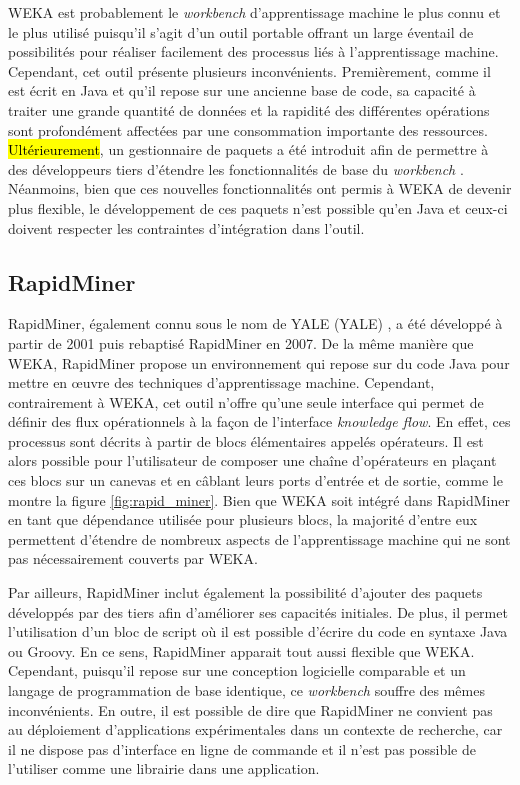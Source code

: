 \acs{WEKA} est probablement le \textit{workbench} d'apprentissage machine le plus connu et le plus utilisé puisqu'il s'agit d'un outil portable \citep{Bouckaert2010} offrant un large éventail de possibilités pour réaliser facilement des processus liés à l'apprentissage machine. Cependant, cet outil présente plusieurs inconvénients. Premièrement, comme il est écrit en Java et qu'il repose sur une ancienne base de code, sa capacité à traiter une grande quantité de données et la rapidité des différentes opérations sont profondément affectées par une consommation importante des ressources. \hl{Ultérieurement}, un gestionnaire de paquets a été introduit afin de permettre à des développeurs tiers d'étendre les fonctionnalités de base du \textit{workbench} \citep{Hall2009}. Néanmoins, bien que ces nouvelles fonctionnalités ont permis à \acs{WEKA} de devenir plus flexible, le développement de ces paquets n'est possible qu'en Java et ceux-ci doivent respecter les contraintes d'intégration dans l'outil.

\subsection{RapidMiner}

RapidMiner, également connu sous le nom de \acs{YALE} (\acl{YALE}) \citep{Ritthoo2003,Hofmann2014}, a été développé à partir de 2001 puis rebaptisé RapidMiner en 2007. De la même manière que \acs{WEKA}, RapidMiner propose un environnement qui repose sur du code Java pour mettre en \oe{}uvre des techniques d'apprentissage machine. Cependant, contrairement à \acs{WEKA}, cet outil n'offre qu'une seule interface qui permet de définir des flux opérationnels à la façon de l'interface \textit{knowledge flow}. En effet, ces processus sont décrits à partir de blocs élémentaires appelés opérateurs. Il est alors possible pour l'utilisateur de composer une chaîne d'opérateurs en plaçant ces blocs sur un canevas et en câblant leurs ports d'entrée et de sortie, comme le montre la figure \ref{fig:rapid_miner}. Bien que \acs{WEKA} soit intégré dans RapidMiner en tant que dépendance utilisée pour plusieurs blocs, la majorité d'entre eux permettent d'étendre de nombreux aspects de l'apprentissage machine qui ne sont pas nécessairement couverts par \acs{WEKA}.

Par ailleurs, RapidMiner inclut également la possibilité d'ajouter des paquets développés par des tiers afin d'améliorer ses capacités initiales. De plus, il permet l'utilisation d'un bloc de script où il est possible d'écrire du code en syntaxe Java ou Groovy. En ce sens, RapidMiner apparait tout aussi flexible que \acs{WEKA}. Cependant, puisqu'il repose sur une conception logicielle comparable et un langage de programmation de base identique, ce \textit{workbench} souffre des mêmes inconvénients. En outre, il est possible de dire que RapidMiner ne convient pas au déploiement d'applications expérimentales dans un contexte de recherche, car il ne dispose pas d'interface en ligne de commande et il n'est pas possible de l'utiliser comme une librairie dans une application.

